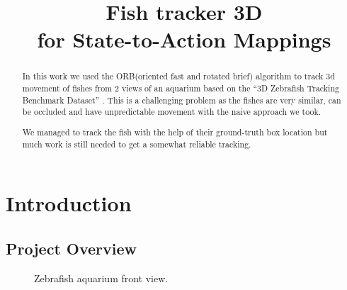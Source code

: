 \documentclass[conference]{IEEEtran}
\begin{document}
\title{Fish tracker 3D\\for State-to-Action Mappings}

\author{ 
    \and
}

\maketitle

\begin{abstract}
In this work we used the ORB(oriented fast and rotated brief)\cite{orb} algorithm to track 3d movement of fishes from 2 views of an aquarium based on the “3D Zebrafish Tracking Benchmark Dataset”\cite{zbfish}
. This is a challenging problem as the fishes are very similar, can be occluded and have unpredictable movement with the naive approach we took. 

We managed to track the fish with the help of their ground-truth box location but much work is still needed to get a somewhat reliable tracking.
 
\end{abstract}



\section{Introduction}\label{sec:intro}
\subsection{Project Overview}
 
\begin{figure}[h]
    \centering
    \caption{Zebrafish aquarium front view.}
    \label{fig:fish}
\end{figure}
\end{document}
